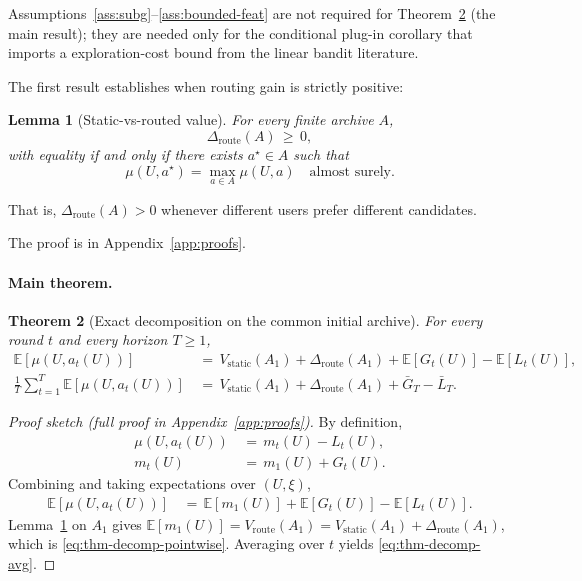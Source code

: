 \documentclass{article} %
\newtheorem{theorem}{Theorem}
\newtheorem{lemma}[theorem]{Lemma}
\providecommand{\E}{\mathbb{E}}
\begin{document}
Assumptions~\ref{ass:subg}--\ref{ass:bounded-feat} are not required for Theorem~\ref{thm:decomp} (the main result); they are needed only for the conditional plug-in corollary that imports a exploration-cost bound from the linear bandit literature.

\label{sec:method-lem-het}

The first result establishes when routing gain is strictly positive:

\begin{lemma}[Static-vs-routed value]
\label{lem:hetero}
For every finite archive $A$,
\begin{equation}
\label{eq:lem-hetero}
\Delta_{\mathrm{route}}(A) \,\ge\, 0,
\end{equation}
with equality if and only if there exists $a^\star \in A$ such that
\begin{equation}
\label{eq:lem-hetero-eq}
\mu(U, a^\star) = \max_{a \in A} \mu(U,a) \quad \text{almost surely.}
\end{equation}
\end{lemma}

That is, $\Delta_{\mathrm{route}}(A) > 0$ whenever different users prefer different candidates.

The proof is in Appendix~\ref{app:proofs}.

\paragraph{Main theorem.}

\label{sec:method-thm-decomp}

\begin{theorem}[Exact decomposition on the common initial archive]
\label{thm:decomp}
For every round $t$ and every horizon $T \ge 1$,
\begin{align}
\E[\mu(U, a_t(U))]
&\,=\, V_{\mathrm{static}}(A_1) + \Delta_{\mathrm{route}}(A_1) + \E[G_t(U)] - \E[L_t(U)],
\label{eq:thm-decomp-pointwise}\\
\frac{1}{T}\sum_{t=1}^T \E[\mu(U, a_t(U))]
&\,=\, V_{\mathrm{static}}(A_1) + \Delta_{\mathrm{route}}(A_1) + \bar G_T - \bar L_T.
\label{eq:thm-decomp-avg}
\end{align}
\end{theorem}

\begin{proof}[Proof sketch (full proof in Appendix~\ref{app:proofs})]
By definition,
\begin{align*}
\mu(U, a_t(U)) &\,=\, m_t(U) - L_t(U), \\
m_t(U) &\,=\, m_1(U) + G_t(U).
\end{align*}
Combining and taking expectations over $(U,\xi)$,
\begin{align*}
\E[\mu(U, a_t(U))] &\,=\, \E[m_1(U)] + \E[G_t(U)] - \E[L_t(U)].
\end{align*}
Lemma~\ref{lem:hetero} on $A_1$ gives $\E[m_1(U)] = V_{\mathrm{route}}(A_1) = V_{\mathrm{static}}(A_1) + \Delta_{\mathrm{route}}(A_1)$, which is \eqref{eq:thm-decomp-pointwise}. Averaging over $t$ yields \eqref{eq:thm-decomp-avg}.
\end{proof}
\end{document}
